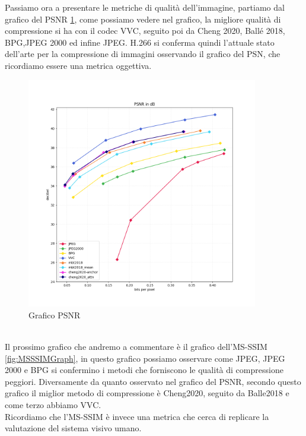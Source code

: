 Passiamo ora a presentare le metriche di qualità dell’immagine, partiamo dal grafico del PSNR \ref{fig:PSNRGraph}, come possiamo vedere nel grafico, la migliore qualità di compressione si ha con il codec VVC, seguito poi da Cheng 2020, Ballé 2018, BPG,JPEG 2000 ed infine JPEG. H.266 si conferma quindi l’attuale stato dell’arte per la compressione di immagini osservando il grafico del PSN, che ricordiamo essere una metrica oggettiva.\\
\begin{figure}[!h]
    \centering
    \includegraphics[width=0.9\textwidth]{Immagini/METRICS/PSNR.png}
    \caption{Grafico PSNR}
    \label{fig:PSNRGraph}
\end{figure}\\
Il prossimo grafico che andremo a commentare è il grafico dell’MS-SSIM \ref{fig:MSSSIMGraph}, in questo grafico possiamo osservare come JPEG, JPEG 2000 e BPG si confermino i metodi che forniscono le qualità di compressione peggiori. Diversamente da quanto osservato nel grafico del PSNR, secondo questo grafico il miglior metodo di compressione è Cheng2020, seguito da Balle2018 e come terzo abbiamo VVC.\\
Ricordiamo che l’MS-SSIM è invece una metrica che cerca di replicare la valutazione del sistema visivo umano.\\
